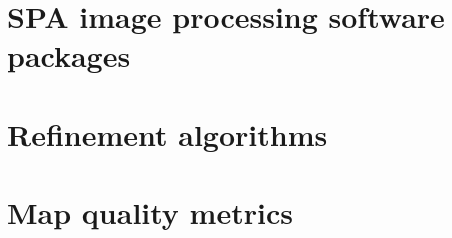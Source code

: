 \documentclass[../main.tex]{subfiles}
\begin{document}
\section{SPA image processing software packages}


\section{Refinement algorithms}


\section{Map quality metrics}

\end{document}

